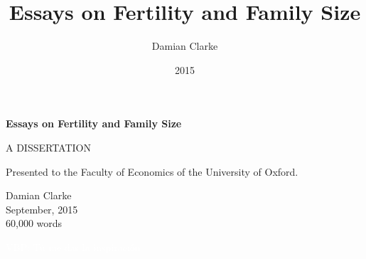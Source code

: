 \documentclass{report}[12pt]
\title{\textbf{Essays on Fertility and Family Size}}
\author{Damian Clarke}
\date{2015}
\begin{document}

\vspace*{\fill}
\vspace{-5cm}
\begin{center}
{\LARGE \textbf{Essays on Fertility and Family Size}}
\end{center}
\vspace*{\fill}

\newpage
\begin{center}
A DISSERTATION \\ \vspace{1cm}

Presented to the Faculty of Economics of the University of Oxford.

\vspace{17cm}
Damian Clarke \\ \vspace{1mm}
September, 2015    \\ \vspace{1mm}
60,000 words
\end{center}



\newpage
\begin{spacing}{1.4}
\begin{center}
\pagestyle{empty}
\textcolor{white}{VBP: T\'u me das la inspiraci\'on}\\
\vspace{5cm}
\end{center}
\end{spacing}
\newpage

\begin{spacing}{1.3}
\setlength\parindent{0.25in}
\setlength\parskip{0.25in}
\begin{abstract}

\end{abstract}
\end{spacing}

\newpage
\tableofcontents
{}
\end{document}
